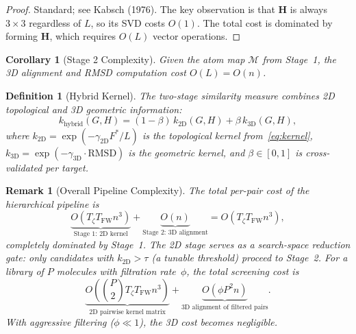 \documentclass[conference]{IEEEtran}
\newtheorem{corollary}{Corollary}
\newtheorem{remark}{Remark}
\newtheorem{definition}{Definition}
\begin{document}
\begin{proof}
Standard; see Kabsch (1976).
The key observation is that $\mathbf{H}$ is always $3 \times 3$
regardless of $L$, so its SVD costs $O(1)$.
The total cost is dominated by forming $\mathbf{H}$, which
requires $O(L)$ vector operations.
\end{proof}

\begin{corollary}[Stage 2 Complexity]
\label{cor:stage2}
Given the atom map $\mathcal{M}$ from Stage~1, the 3D
alignment and RMSD computation cost $O(L) = O(n)$.
\end{corollary}

\begin{definition}[Hybrid Kernel]
\label{def:hybrid}
The two-stage similarity measure combines 2D topological
and 3D geometric information:
\begin{equation}
k_{\text{hybrid}}(G, H)
  = (1 - \beta)\, k_{\text{2D}}(G, H)
  + \beta\, k_{\text{3D}}(G, H),
\label{eq:hybrid-kernel}
\end{equation}
where
$k_{\text{2D}} = \exp(-\gamma_{\text{2D}} F^*/L)$ is the
topological kernel from~\eqref{eq:kernel},
$k_{\text{3D}} = \exp(-\gamma_{\text{3D}} \cdot \mathrm{RMSD})$
is the geometric kernel,
and $\beta \in [0,1]$ is cross-validated per target.
\end{definition}

\begin{remark}[Overall Pipeline Complexity]
The total per-pair cost of the hierarchical pipeline is
\begin{equation}
\underbrace{O(T_\zeta T_{\mathrm{FW}} n^3)}_{\text{Stage 1: 2D kernel}}
+ \underbrace{O(n)}_{\text{Stage 2: 3D alignment}}
= O(T_\zeta T_{\mathrm{FW}} n^3),
\label{eq:pipeline-complexity}
\end{equation}
completely dominated by Stage~1.
The 2D stage serves as a search-space reduction gate:
only candidates with $k_{\text{2D}} > \tau$
(a tunable threshold) proceed to Stage~2.
For a library of $P$ molecules with filtration rate~$\phi$,
the total screening cost is
\begin{equation}
\underbrace{O\!\left(\binom{P}{2} T_\zeta T_{\mathrm{FW}} n^3\right)}_{\text{2D pairwise kernel matrix}}
+ \underbrace{O(\phi P^2 n)}_{\text{3D alignment of filtered pairs}}.
\label{eq:screening-cost}
\end{equation}
With aggressive filtering ($\phi \!\ll\! 1$), the 3D
cost becomes negligible.
\end{remark}
\end{document}

